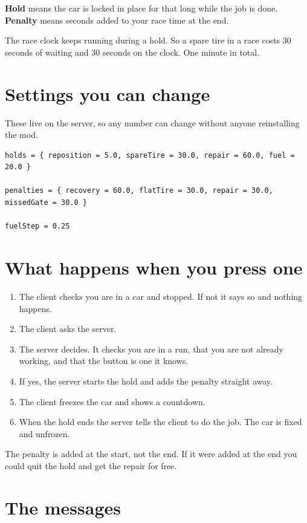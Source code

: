 \documentclass[11pt,a4paper]{article}
\begin{document}
\textbf{Hold} means the car is locked in place for that long while the job is
done. \textbf{Penalty} means seconds added to your race time at the end.

The race clock keeps running during a hold. So a spare tire in a race costs 30
seconds of waiting and 30 seconds on the clock. One minute in total.

\section{Settings you can change}

These live on the server, so any number can change without anyone
reinstalling the mod.

\begin{lstlisting}
holds = { reposition = 5.0, spareTire = 30.0, repair = 60.0, fuel = 20.0 }

penalties = { recovery = 60.0, flatTire = 30.0, repair = 30.0, missedGate = 30.0 }

fuelStep = 0.25
\end{lstlisting}

\section{What happens when you press one}

\begin{enumerate}
  \item The client checks you are in a car and stopped. If not it says so and
        nothing happens.
  \item The client asks the server.
  \item The server decides. It checks you are in a run, that you are not
        already working, and that the button is one it knows.
  \item If yes, the server starts the hold and adds the penalty straight away.
  \item The client freezes the car and shows a countdown.
  \item When the hold ends the server tells the client to do the job. The car
        is fixed and unfrozen.
\end{enumerate}

The penalty is added at the start, not the end. If it were added at the end
you could quit the hold and get the repair for free.

\section{The messages}
\end{document}
